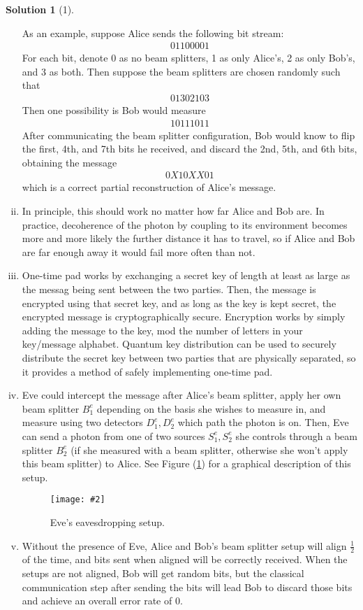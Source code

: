 \documentclass[11pt]{article}
\theoremstyle{definition}
\newtheorem*{solution}{Solution}
\newcommand{\eq}{\begin{equation}\begin{aligned}}
\newcommand{\qe}{\end{aligned}\end{equation}}
\newcommand{\img}[4][0.5\textwidth]{
  \begin{figure}[h]
    \centering
    \texttt{[image: \#2]}
    \caption{#3}
    \label{#4}
  \end{figure}
}
\begin{document}
\begin{solution}[1]
\begin{enumerate}[(i)]
    As an example, suppose Alice sends the following bit stream:
    \eq
      01100001
    \qe
    For each bit, denote 0 as no beam splitters, 1 as only Alice's, 2 as only Bob's, and 3 as both. Then suppose the beam splitters are chosen randomly such that
    \eq
      01302103
    \qe
    Then one possibility is Bob would measure
    \eq
      10111011
    \qe
    After communicating the beam splitter configuration, Bob would know to flip the first, 4th, and 7th bits he received, and discard the 2nd, 5th, and 6th bits, obtaining the message
    \eq
      0X10XX01
    \qe
    which is a correct partial reconstruction of Alice's message.
    \item In principle, this should work no matter how far Alice and Bob are. In practice, decoherence of the photon by coupling to its environment becomes more and more likely the further distance it has to travel, so if Alice and Bob are far enough away it would fail more often than not.
    \item One-time pad works by exchanging a secret key of length at least as large as the messag being sent between the two parties. Then, the message is encrypted using that secret key, and as long as the key is kept secret, the encrypted message is cryptographically secure. Encryption works by simply adding the message to the key, mod the number of letters in your key/message alphabet. Quantum key distribution can be used to securely distribute the secret key between two parties that are physically separated, so it provides a method of safely implementing one-time pad.
    \item Eve could intercept the message after Alice's beam splitter, apply her own beam splitter $B^e_1$ depending on the basis she wishes to measure in, and measure using two detectors $D^e_1,D^e_2$ which path the photon is on. Then, Eve can send a photon from one of two sources $S^e_1,S^e_2$ she controls through a beam splitter $B^e_2$ (if she measured with a beam splitter, otherwise she won't apply this beam splitter) to Alice. See Figure (\ref{fig:eve}) for a graphical description of this setup.
    \img{1iv}{Eve's eavesdropping setup.}{fig:eve}
    \item Without the presence of Eve, Alice and Bob's beam splitter setup will align $\frac{1}{2}$ of the time, and bits sent when aligned will be correctly received. When the setups are not aligned, Bob will get random bits, but the classical communication step after sending the bits will lead Bob to discard those bits and achieve an overall error rate of $\boxed{0}$.\\

\end{enumerate}
\end{solution}
\end{document}
